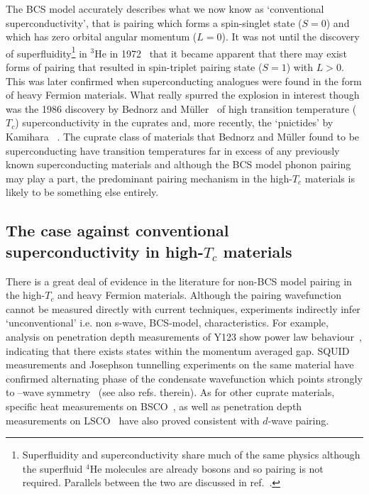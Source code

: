 The \ac{BCS} model accurately describes what we now know as `conventional superconductivity', that is pairing which forms a spin-singlet state ($S=0$) and which has zero orbital angular momentum ($L=0$). It was not until the discovery of superfluidity\footnote{Superfluidity and superconductivity share much of the same physics although the superfluid $^4$He molecules are already bosons and so pairing is not required. Parallels between the two are discussed in ref.~\cite{Annett2010}.} in $^3$He in 1972~\cite{Osheroff1972} that it became apparent that there may exist forms of pairing that resulted in spin-triplet pairing state ($S=1$) with $L>0$. This was later confirmed when superconducting analogues were found in the form of heavy Fermion materials. What really spurred the explosion in interest though was the 1986 discovery by Bednorz and M\"uller~\cite{Bednorz} of high transition temperature ($T_c$) superconductivity in the cuprates and, more recently, the `pnictides' by Kamihara \etal~\cite{Kamihara2008}. The cuprate class of materials that Bednorz and M\"uller found to be superconducting have transition temperatures far in excess of any previously known superconducting materials and although the \ac{BCS} model phonon pairing may play a part, the predominant pairing mechanism in the high-$T_c$ materials is likely to be something else entirely.

\subsection{The case against conventional superconductivity in high-$T_c$ materials}

There is a great deal of evidence in the literature for non-\ac{BCS} model pairing in the high-$T_c$ and heavy Fermion materials. Although the pairing wavefunction cannot be measured directly with current techniques, experiments indirectly infer `unconventional' i.e. non s-wave, \ac{BCS}-model, characteristics. For example, analysis on penetration depth measurements of \ac{Y123} show power law behaviour~\cite{Annett1991}, indicating that there exists states within the momentum averaged gap. SQUID measurements and Josephson tunnelling experiments on the same material have confirmed alternating phase of the condensate wavefunction which points strongly to \DxTwoyTwo--wave symmetry~\cite{VanHarlingen1994} (see also refs. therein). As for other cuprate materials, specific heat measurements on \ac{BSCO}~\cite{Wang2011}, as well as penetration depth measurements on LSCO~\cite{Froehlich1996} have also proved consistent with $d$-wave pairing. 

